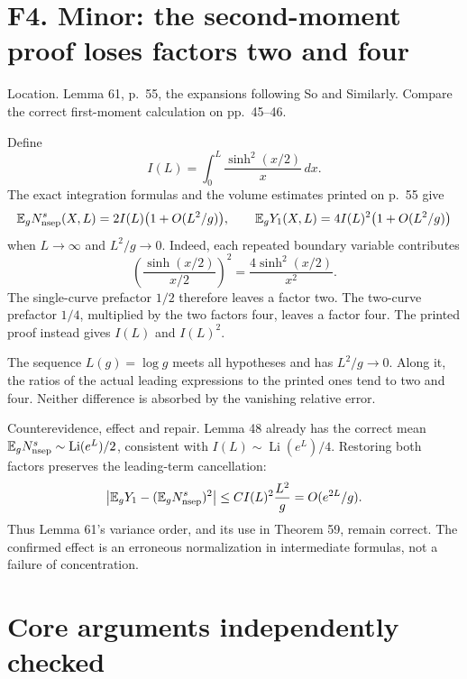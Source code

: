 \documentclass[10pt]{article}
\begin{document}
\section*{F4. Minor: the second-moment proof loses factors two and four}
Location. Lemma 61, p. 55, the expansions following So and Similarly. Compare the correct first-moment calculation on pp. 45–46.\par
Define \[I(L)=\int_0^L\frac{\sinh^2(x/2)}x\,dx.\] The exact integration formulas and the volume estimates printed on p. 55 give \[\mathbb E_g N_{\rm nsep}^{s}(X,L)
 =2I(L)\bigl(1+O(L^2/g)\bigr),
 \qquad
 \mathbb E_gY_1(X,L)=4I(L)^2\bigl(1+O(L^2/g)\bigr)\] when \(L\to\infty\) and \(L^2/g\to0\). Indeed, each repeated boundary variable contributes \[\left(\frac{\sinh(x/2)}{x/2}\right)^2
       =\frac{4\sinh^2(x/2)}{x^2}.\] The single-curve prefactor \(1/2\) therefore leaves a factor two. The two-curve prefactor \(1/4\), multiplied by the two factors four, leaves a factor four. The printed proof instead gives \(I(L)\) and \(I(L)^2\).\par
The sequence \(L(g)=\log g\) meets all hypotheses and has \(L^2/g\to0\). Along it, the ratios of the actual leading expressions to the printed ones tend to two and four. Neither difference is absorbed by the vanishing relative error.\par
Counterevidence, effect and repair. Lemma 48 already has the correct mean \(\mathbb E_gN_{\rm nsep}^{s}\sim\operatorname{Li}(e^L)/2\), consistent with \(I(L)\sim\operatorname{Li}(e^L)/4\). Restoring both factors preserves the leading-term cancellation: \[\left|\mathbb E_gY_1-(\mathbb E_gN_{\rm nsep}^{s})^2\right|
 \le C I(L)^2\frac{L^2}{g}
 =O(e^{2L}/g).\] Thus Lemma 61’s variance order, and its use in Theorem 59, remain correct. The confirmed effect is an erroneous normalization in intermediate formulas, not a failure of concentration.\par
\section*{Core arguments independently checked}
\end{document}
